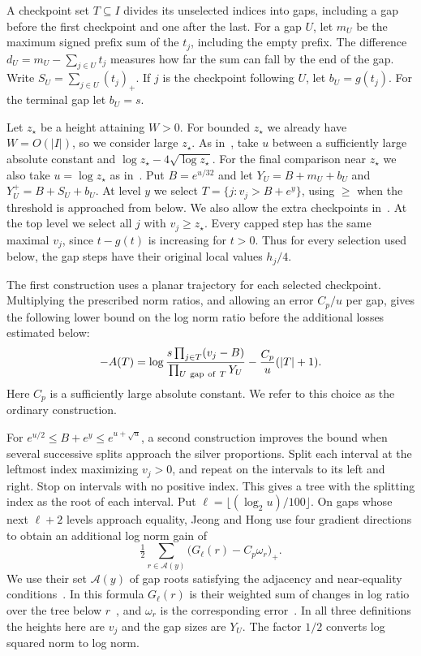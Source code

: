 \documentclass[11pt]{article}
\theoremstyle{definition}
\begin{document}
A checkpoint set \(T\subseteq I\) divides its unselected indices into
gaps, including a gap before the first checkpoint and one after the last.
For a gap \(U\), let \(m_U\) be the maximum signed prefix sum of the
\(t_j\), including the empty prefix. The difference
\(d_U=m_U-\sum_{j\in U}t_j\) measures how far the sum can fall by
the end of the gap. Write \(S_U=\sum_{j\in U}(t_j)_+\).
If \(j\) is the checkpoint following \(U\), let \(b_U=g(t_j)\).
For the terminal gap let \(b_U=s\).

Let \(z_\star\) be a height attaining \(W>0\). For bounded \(z_\star\)
we already have \(W=O(|I|)\), so we consider large \(z_\star\).
As in~\cite[(5.6)--(5.9)]{JH}, take \(u\) between a sufficiently
large absolute constant and \(\log z_\star-4\sqrt{\log z_\star}\).
For the final comparison near \(z_\star\) we also take \(u=\log z_\star\)
as in~\cite[Lemma~5.2]{JH}. Put \(B=e^{u/32}\) and let
\(Y_U=B+m_U+b_U\) and \(Y_U^+=B+S_U+b_U\).
At level \(y\) we select \(T=\{j:v_j>B+e^y\}\), using
\(\ge\) when the threshold is approached from below. We also allow
the extra checkpoints in~\cite[(5.24), (7.12)]{JH}. At the top level
we select all \(j\) with \(v_j\ge z_\star\). Every capped step has
the same maximal \(v_j\), since \(t-g(t)\) is increasing for \(t>0\).
Thus for every selection used below, the gap steps have their original
local values \(h_j/4\).

The first construction uses a planar trajectory for each selected
checkpoint. Multiplying the prescribed norm ratios, and allowing an
error \(C_p/u\) per gap, gives the following lower bound on the log norm
ratio before the additional losses estimated below:
\[
 -A(T)=\log\frac{s\prod_{j\in T}(v_j-B)}
                      {\prod_{U\ {\rm gap\ of}\ T}Y_U}
             -\frac{C_p}{u}(|T|+1).
\]
Here \(C_p\) is a sufficiently large absolute constant. We refer to
this choice as the ordinary construction.

For \(e^{u/2}\le B+e^y\le e^{u+\sqrt{u}}\), a second construction
improves the bound when several successive splits approach the silver
proportions. Split each interval at the leftmost index maximizing
\(v_j>0\), and repeat on the intervals to its left and right. Stop on
intervals with no positive index. This gives a tree with the splitting
index as the root of each interval. Put
\(\ell=\lfloor(\log_2 u)/100\rfloor\). On gaps whose next \(\ell+2\)
levels approach equality, Jeong and Hong use four gradient directions
to obtain an additional log norm gain of
\[
 \tfrac12\sum_{r\in\mathcal A(y)}
           \bigl(G_\ell(r)-C_p\omega_r\bigr)_+ .
\]
We use their set \(\mathcal A(y)\) of gap roots satisfying the adjacency
and near-equality conditions~\cite[(6.45)--(6.49)]{JH}. In this
formula \(G_\ell(r)\) is their weighted sum of changes in log ratio
over the tree below \(r\)~\cite[(6.30)--(6.31)]{JH}, and
\(\omega_r\) is the corresponding error~\cite[(6.53)]{JH}. In all
three definitions the heights here are \(v_j\) and the gap sizes are
\(Y_U\). The factor \(1/2\) converts log squared norm to log norm.
\end{document}
